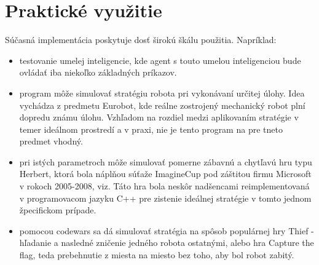 \documentclass[12pt,a4paper,notitlepage]{report}
\begin{document}
\section{Praktické využitie}
Súčasná implementácia poskytuje dosť širokú škálu použitia. Napríklad:\\
	\begin{itemize}
	\item testovanie umelej inteligencie, kde agent s touto umelou inteligenciou bude ovládať iba niekoľko základných príkazov.
	\item program môže simulovať stratégiu robota pri vykonávaní určitej úlohy. Idea vychádza z predmetu Eurobot, kde reálne zostrojený mechanický robot plní dopredu známu úlohu. Vzhľadom na rozdiel medzi aplikovaním stratégie v temer ideálnom prostredí a v praxi, nie je tento program na pre tneto predmet vhodný.
	\item pri istých parametroch môže simulovať pomerne zábavnú a chytľavú hru typu Herbert, ktorá bola náplňou súťaže ImagineCup pod záštitou firmu Microsoft v rokoch 2005-2008, viz\cite{imaginecup}. Táto hra bola neskôr nadšencami reimplementovaná v programovacom jazyku C++ pre zistenie ideálnej stratégie v tomto jednom žpecifickom prípade. %
	\item pomocou codewars sa dá simulovať stratégia na spôsob populárnej hry Thief - hľadanie a nasledné zničenie jedného robota ostatnými, alebo hra Capture the flag, teda prebehnutie z miesta na miesto bez toho, aby bol robot zabitý.
	\end{itemize}


\end{document}

